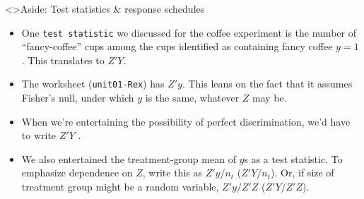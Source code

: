 \begin{frame}<\nottheirhandout>{Aside: Test statistics \& response schedules}
  
\begin{itemize}
\item One \texttt{test statistic} we discussed for the coffee experiment is the number of ``fancy-coffee'' cups among the cups identified as containing fancy coffee $y=1$. This translates to $Z'Y$. \pause


\item The worksheet (\texttt{unit01-Rex}) has $Z'y$.  This leans on the fact that it assumes Fisher's null, under which $y$ is the same, whatever $Z$ may be. \pause

\item When we're entertaining the possibility of perfect discrimination, we'd have to write $Z'Y$ .
\item We also entertained the treatment-group mean of $y$s as a test
  statistic. To emphasize dependence on $Z$, write this as $Z'y/n_{t}$
  ($Z'Y/n_{t}$). Or, if size of treatment group might be a random
  variable, $Z'y/Z'Z$  ($Z'Y/Z'Z$).
\end{itemize}
\end{frame}

